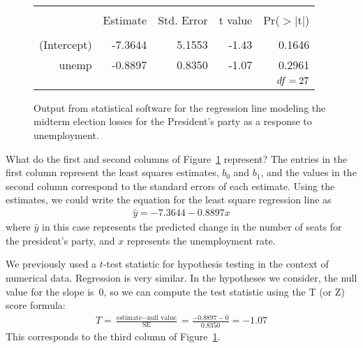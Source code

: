\begin{figure}[ht]
\centering
\begin{tabular}{rrrrr}
  \hline
  \vspace{-3.7mm} & & & & \\
  & Estimate & Std. Error & t value & Pr($>$$|$t$|$) \\ 
  \hline
  \vspace{-3.6mm} & & & & \\
  (Intercept) & -7.3644 & 5.1553 & -1.43 & 0.1646 \\ 
  unemp & -0.8897 & 0.8350 & -1.07 & 0.2961 \\ 
  \hline
  \multicolumn{5}{r}{$df=27{}$} \\
\end{tabular}
\caption{Output from statistical software for the regression
    line modeling the midterm election losses for the
    President's party as a response to unemployment.}
\label{midtermUnempRegTable}
\end{figure}

\begin{examplewrap}
\begin{nexample}{What do the first and second columns
    of Figure~\ref{midtermUnempRegTable} represent?}
  The entries in the first column represent the least
  squares estimates, $b_0$ and $b_1$, and the values in
  the second column correspond to the standard errors
  of each estimate.
  Using the estimates, we could write the equation
  for the least square regression line as
  \begin{align*}
  \hat{y} = -7.3644 - 0.8897 x
  \end{align*}
  where $\hat{y}$ in this case represents the predicted
  change in the number of seats for the president's party,
  and $x$ represents the unemployment rate.
\end{nexample}
\end{examplewrap}

We previously used a $t$-test statistic for hypothesis testing
in the context of numerical data.
Regression is very similar.
In the hypotheses we consider, the null value for the slope is~0,
so we can compute the test statistic using the T (or Z) score
formula:
\begin{align*}
T
  = \frac{\text{estimate} - \text{null value}}{\text{SE}}
  = \frac{-0.8897 - 0}{0.8350}
  = -1.07
\end{align*}
This corresponds to the third column of
Figure~\ref{midtermUnempRegTable}.

